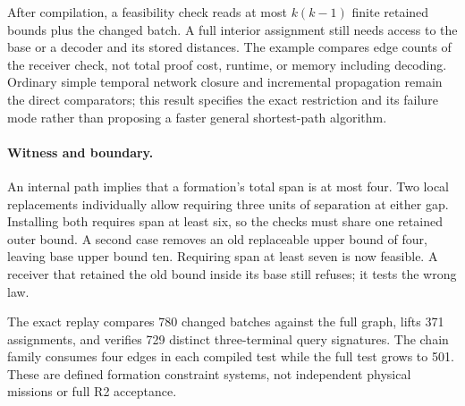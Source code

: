 \documentclass[11pt]{article}
\begin{document}
After compilation, a feasibility check reads at most \(k(k-1)\)
finite retained bounds plus the changed batch. A full interior
assignment still needs access to the base or a decoder and its
stored distances. The example compares edge counts of the receiver
check, not total proof cost, runtime, or memory including decoding.
Ordinary simple temporal network closure and incremental
propagation remain the direct comparators; this result specifies
the exact restriction and its failure mode rather than proposing
a faster general shortest-path algorithm.

\paragraph{Witness and boundary.}
An internal path implies that a formation's total span is at
most four. Two local replacements individually allow requiring
three units of separation at either gap. Installing both requires
span at least six, so the checks must share one retained outer bound.
A second case removes an old replaceable upper bound of four,
leaving base upper bound ten. Requiring span at least seven is
now feasible. A receiver that retained the old bound inside its
base still refuses; it tests the wrong law.

The exact replay compares 780 changed batches against the full graph,
lifts 371 assignments, and verifies 729 distinct three-terminal
query signatures. The chain family consumes four edges in each
compiled test while the full test grows to 501. These are defined
formation constraint systems, not independent physical missions
or full R2 acceptance.
\end{document}

